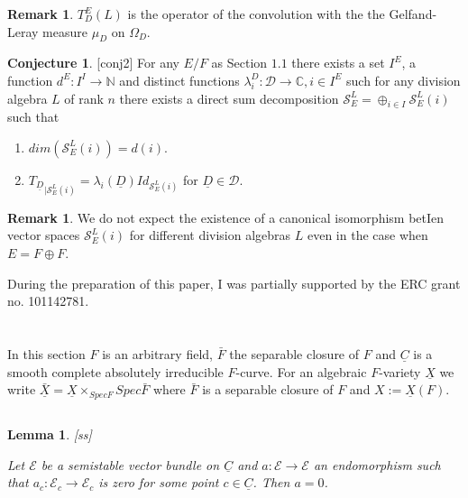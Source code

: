 \documentclass[11pt,a4paper,twoside]{amsart}
\newtheorem{lemma}[theorem]{Lemma}
\theoremstyle{definition}
\newtheorem{conjecture}[theorem]{Conjecture}
\newtheorem{remark}[theorem]{Remark}
\newcommand{\mC}{\mathbb C}
\newcommand{\mN}{\mathbb N}
\newcommand{\mcD}{\mathcal D}
\newcommand{\mcE}{\mathcal E}
\newcommand{\mcS}{\mathcal S}
\newcommand{\bO}{\Omega}
\newcommand{\bl}{\lambda}
\newcommand{\un}{\underline}
\newcommand{\sms}{\smallskip}
\begin{document}
\begin{remark} $T_D^E(L)$ is the operator of the convolution with the the Gelfand-Leray measure $\mu _D$ on $	\bO _D$.\end{remark}

\begin{conjecture}\label{conj2}[conj2] For any $E/F$ as Section $1.1$ there exists  a set $I^E$, a function $d^E: I^I \to \mN$
and distinct functions $\bl ^D_i:\mcD \to \mC ,i\in I^E$
such for any division algebra $L$ of rank $n$ there exists a direct sum decomposition $\mcS ^L_E = \oplus _{i\in I} \mcS ^L_E(i)$ such that  

\begin{enumerate}
\item $dim ( \mcS ^L_E (i)) = d(i)$.
\item ${T_ {\un D}}_{| \mcS ^L_E (i)}= \bl _i(\un D)Id _{   \mcS ^L_E (i)}$ for $ \un D \in \mcD$.
\end{enumerate}
\end{conjecture}
\begin{remark}We do not expect the existence of a canonical isomorphism betIen vector spaces $  \mcS ^L_E (i) $ for different division algebras $L$ even in the case when $E=F\oplus F$.
\end{remark}

During the preparation of this paper, I was partially supported by
the ERC grant no. 101142781.


 \section{}In this section $F$ 
is an arbitrary field, $\bar F $ the separable closure of $F$
 and  $\un C$ is a smooth complete absolutely irreducible $F$-curve.
For an algebraic $F$-variety $\un X$ we write $\un {\bar X}= \un X \times _{Spec F}Spec \bar F$ where $\bar F$ is a separable closure of $F$ and $X:= \un X(F)$. 

\subsection{}

\begin{lemma}\label{ss}[ss]

\sms

Let
$ \mcE$ be a semistable vector bundle on $ {\un C}$
and $a:  \mcE \to  \mcE $ an endomorphism such that $a_c:{\mcE_c}\to  \mcE_c$ is zero for some point $c\in \un { C} $.
Then $a=0$.

\end{lemma}
\end{document}
